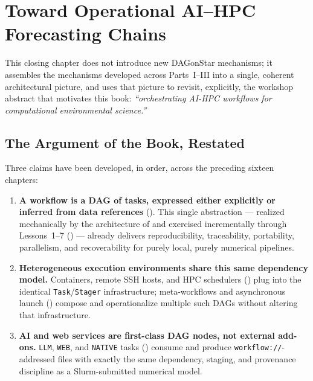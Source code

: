 \chapter{Toward Operational AI--HPC Forecasting Chains}
\label{ch:synthesis}

This closing chapter does not introduce new DAGonStar mechanisms; it
assembles the mechanisms developed across Parts~I--III into a single,
coherent architectural picture, and uses that picture to revisit, explicitly,
the workshop abstract that motivates this book: \emph{``orchestrating AI-HPC
workflows for computational environmental science.''}

\section{The Argument of the Book, Restated}

Three claims have been developed, in order, across the preceding sixteen
chapters:

\begin{enumerate}[leftmargin=1.8em]
  \item \textbf{A workflow is a DAG of tasks, expressed either explicitly or
    inferred from data references} (). This
    single abstraction --- realized mechanically by the architecture of
     and exercised incrementally through
    Lessons~1--7 ()
    --- already delivers reproducibility, traceability, portability,
    parallelism, and recoverability for purely local, purely numerical
    pipelines.
  \item \textbf{Heterogeneous execution environments share this same
    dependency model.} Containers, remote SSH hosts, and HPC schedulers
    () plug into the identical \texttt{Task}/\texttt{Stager}
    infrastructure; meta-workflows and asynchronous launch
    () compose and operationalize multiple such DAGs
    without altering that infrastructure.
  \item \textbf{AI and web services are first-class DAG nodes, not external
    add-ons.} \texttt{LLM}, \texttt{WEB}, and \texttt{NATIVE} tasks
    () consume and produce
    \texttt{workflow://}-addressed files with exactly the same dependency,
    staging, and provenance discipline as a Slurm-submitted numerical model.
\end{enumerate}

